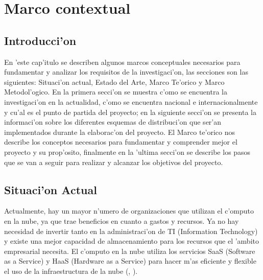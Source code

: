 
\chapter{Marco contextual}
\section*{Introducci'on}

En 'este cap'itulo se describen algunos marcos conceptuales necesarios para fundamentar y analizar los requisitos de la investigaci'on, las secciones son las siguientes: Situaci'on actual, Estado del Arte, Marco Te'orico y Marco Metodol'ogico. En la primera secci'on se muestra c'omo se encuentra la investigaci'on en la actualidad, c'omo se encuentra nacional e internacionalmente y cu'al es el punto de partida del proyecto; en la siguiente secci'on se presenta la informaci'on sobre los diferentes esquemas de distribuci'on que ser'an implementados durante la elaborac'on del proyecto. El Marco te'orico nos describe los conceptos necesarios para fundamentar y comprender mejor el proyecto y su prop'osito, finalmente en la 'ultima secci'on se describe los pasos que se van a seguir para realizar y alcanzar los objetivos del proyecto.

\newpage


\section{Situaci'on Actual}

Actualmente, hay un mayor n'umero de organizaciones que utilizan el c'omputo en la nube, ya que trae beneficios en cuanto a gastos y recursos. Ya no hay necesidad de invertir tanto en la administraci'on de TI (Information Technology) y existe una mejor capacidad de almacenamiento para los recursos que el 'ambito empresarial necesita.
El c'omputo en la nube utiliza los servicios SaaS (Software as a Service) y HaaS (Hardware as a Service) para hacer m'as eficiente y flexible el uso de la infraestructura de la nube (\citeauthor{mariscal2013computo}, \citeyear{mariscal2013computo}). 

